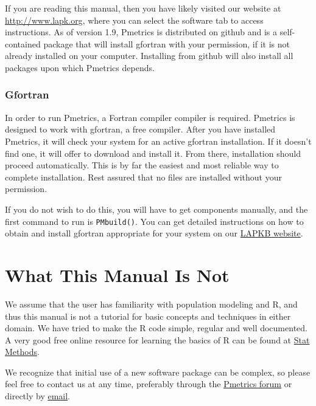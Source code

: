 \documentclass[
]{book}
\begin{document}
If you are reading this manual, then you have likely visited our website
at \href{http://www.lapk.org}{\underline{http://www.lapk.org}}, where you
can select the software tab to access instructions.
As of version 1.9, Pmetrics is distributed on github and is a self-contained
package that will install gfortran with your permission, if it is not
already installed on your computer. Installing from github will also install
all packages upon which Pmetrics depends.

\hypertarget{gfortran}{%
\subsubsection{Gfortran}\label{gfortran}}

In order to run Pmetrics, a Fortran compiler compiler is required.
Pmetrics is designed to work with gfortran, a free compiler. After you
have installed Pmetrics, it will check your system for an active
gfortran installation. If it doesn't find one, it will offer to download
and install it. From there, installation should proceed automatically.
This is by far the easiest and most reliable way to complete
installation. Rest assured that no files are installed without your
permission.

If you do not wish to do this, you will have to get components manually,
and the first command to run is \texttt{PMbuild()}. You can get detailed
instructions on how to obtain and install gfortran appropriate for your
system on our \href{http://www.lapk.org/Pmetrics_install_manual.php}{LAPKB website}.

\hypertarget{what-this-manual-is-not}{%
\section{What This Manual Is Not}\label{what-this-manual-is-not}}

We assume that the user has familiarity with population modeling and R,
and thus this manual is not a tutorial for basic concepts and techniques
in either domain. We have tried to make the R code simple, regular and
well documented. A very good free online resource for learning the
basics of R can be found at \href{http://www.statmethods.net/index.html}{Stat Methods}.

We recognize that initial use of a new software package can be complex,
so please feel free to contact us at any time, preferably through the
\href{http:/www.lapk.org}{Pmetrics forum} or directly by \href{mailto:contact@lapk.org}{email}.
\end{document}
